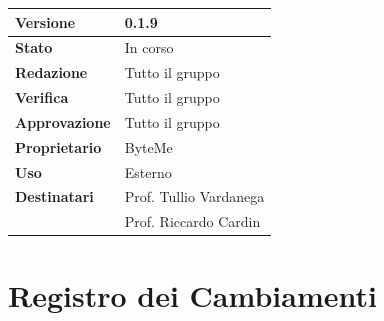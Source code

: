 \documentclass[11pt,a4paper]{article}
\begin{document}
\begin{titlepage}
    \begin{table}[H]
        \centering
        \begin{tabular}{|l|p{5cm}|}
            \hline
            \textbf{Versione} & 0.1.9 \\
            \hline
            \textbf{Stato} & In corso \\
            \hline
            \textbf{Redazione} & Tutto il gruppo \\
            \hline
            \textbf{Verifica} & Tutto il gruppo \\
            \hline
            \textbf{Approvazione} & Tutto il gruppo \\
            \hline
            \textbf{Proprietario} & ByteMe \\
            \hline
            \textbf{Uso} & Esterno \\
            \hline
            \textbf{Destinatari} & Prof. Tullio Vardanega \\ & Prof. Riccardo Cardin \\
            \hline
        \end{tabular}
    \end{table}
    
    \vfill
\end{titlepage}

\thispagestyle{empty}
\section*{Registro dei Cambiamenti}
\end{document}

